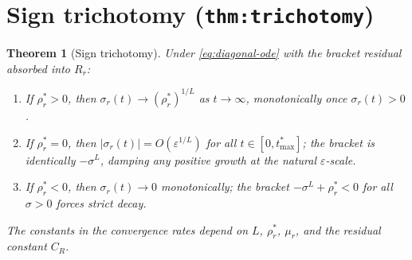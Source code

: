 \documentclass[11pt]{article}
\newcommand{\eps}{\varepsilon}
\newcommand{\rhostar}{\rho_r^*}
\newcommand{\sigmar}{\sigma_r}
\theoremstyle{plain}
\newtheorem{theorem}{Theorem}[section]
\theoremstyle{definition}
\theoremstyle{remark}
\begin{document}
\section{Sign trichotomy (\texttt{thm:trichotomy})}
\label{sec:trichotomy}

\begin{theorem}[Sign trichotomy]
Under \eqref{eq:diagonal-ode} with the bracket residual absorbed into $R_r$:
\begin{enumerate}[label=(\roman*),leftmargin=2em,itemsep=2pt]
\item If $\rhostar > 0$, then $\sigmar(t) \to (\rhostar)^{1/L}$ as $t \to \infty$,
monotonically once $\sigmar(t) > 0$.
\item If $\rhostar = 0$, then $|\sigmar(t)| = O(\eps^{1/L})$ for all
$t \in [0, t_{\max}^*]$; the bracket is identically $-\sigma^L$, damping any
positive growth at the natural $\eps$-scale.
\item If $\rhostar < 0$, then $\sigmar(t) \to 0$ monotonically; the bracket
$-\sigma^L + \rhostar < 0$ for all $\sigma > 0$ forces strict decay.
\end{enumerate}
The constants in the convergence rates depend on $L$, $\rhostar$, $\mu_r$, and the
residual constant $C_R$.
\end{theorem}
\end{document}
